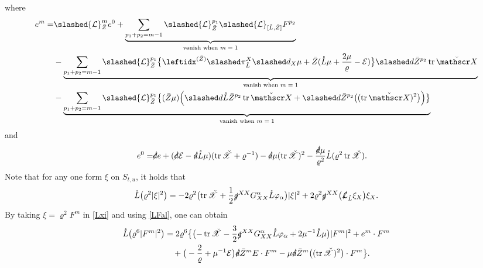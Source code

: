 \documentclass[11pt,twoside]{article}
\def\al{\alpha}
\def\vp{\varphi}
\def\f{\frac}
\begin{document}
where
\begin{align}
e^m=&\slashed{\mathcal L}_{\bar Z}^m e^0+\underbrace{\sum_{p_1+p_2=m-1}{\tiny {\tiny {\tiny {\tiny }}}}\slashed{\mathcal L}_{\bar Z}^{p_1}\slashed{\mathcal L}_{[\mathring L,\bar Z]}F^{p_2}}_{\text{vanish when $m=1$}}\nonumber\\
&-\underbrace{\sum_{p_1+p_2=m-1}{\tiny {\tiny {\tiny {\tiny }}}}\slashed{\mathcal L}_{\bar Z}^{p_1}\bigl\{\leftidx^{{(\bar Z)}}\slashed\pi_{\mathring L}^X\slashed d_X\mu+\bar Z(\mathring L\mu+\f{2\mu}{\varrho}-\mathcal E)\bigr\}\slashed d\bar Z^{p_2}\operatorname{tr}\check{\mathscr X}}_{\text{vanish when $m=1$}}\label{eal}\\
&-\underbrace{\sum_{p_1+p_2=m-1}{\tiny {\tiny {\tiny {\tiny }}}}\slashed{\mathcal L}_{\bar Z}^{p_1}\bigl\{(\bar Z\mu)\Bigl(\slashed d\mathring L\bar Z^{p_2}\operatorname{tr}\check{\mathscr X}+\slashed d\bar Z^{p_2}\bigl((\operatorname{tr}\check{\mathscr X})^2\bigr)\Bigr)\bigr\}}_{\text{vanish when $m=1$}}\nonumber
\end{align}
and
\begin{equation}\label{e0}
\begin{split}
e^0=&\slashed de+(\slashed d\mathcal E-\slashed d\mathring L\mu)(\operatorname{tr}\check{\mathscr X}+\varrho^{-1})-\slashed d\mu(\operatorname{tr}\check{\mathscr X})^2-\f{\slashed d\mu}{\varrho^2}\mathring L(\varrho^2\operatorname{tr}\check{\mathscr X}).
\end{split}
\end{equation}
Note that for any one form $\xi$ on $S_{t,u}$, it holds that
\begin{equation}\label{Lxi}
\mathring{L}\bigl(\varrho^2|\xi|^2\bigr)
= -2\varrho^2\bigl(\operatorname{tr}\check{\mathscr{X}}
+ \frac{1}{2}\slashed{g}^{XX}G_{XX}^\al\mathring{L}\vp_\al\bigr)|\xi|^2
+ 2\varrho^2\slashed{g}^{XX}\bigl(\slashed{\mathcal{L}}_{\mathring{L}}\xi_X\bigr)\xi_X.
\end{equation}
By taking $\xi = \varrho^2 F^m$ in \eqref{Lxi} and using \eqref{LFal}, one can obtain
\begin{equation*}
\begin{split}
\mathring{L}\bigl(\varrho^6|F^m|^2\bigr)
&= 2\varrho^6\big\{ \bigl(-\operatorname{tr}\check{\mathscr{X}}
-\frac{3}{2}\slashed{g}^{XX}G_{XX}^\al\mathring{L}\vp_\al
+2\mu^{-1}\mathring L\mu\bigr)|F^m|^2 + e^m \cdot F^m \\
& \quad + \big(-\frac{2}{\varrho} + \mu^{-1}\mathcal{E}\big)\slashed{d}\bar{Z}^m E \cdot F^m
- \mu\slashed{d}\bar{Z}^m\big((\operatorname{tr}\check{\mathscr{X}})^2\big) \cdot F^m \big\}.
\end{split}
\end{equation*}
\end{document}
